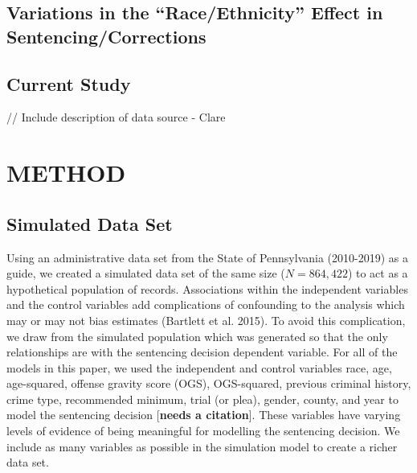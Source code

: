 \documentclass[
  letterpaper,
  DIV=11,
  numbers=noendperiod]{scrartcl}
\begin{document}
\hypertarget{sec-race-effect-sentencing}{%
\subsection{Variations in the ``Race/Ethnicity'' Effect in
Sentencing/Corrections}\label{sec-race-effect-sentencing}}

\hypertarget{sec-current-study}{%
\subsection{Current Study}\label{sec-current-study}}

// Include description of data source - Clare

\hypertarget{sec-method}{%
\section{METHOD}\label{sec-method}}

\hypertarget{sec-sim-data}{%
\subsection{Simulated Data Set}\label{sec-sim-data}}

Using an administrative data set from the State of Pennsylvania
(2010-2019) as a guide, we created a simulated data set of the same size
(\(N = 864,422\)) to act as a hypothetical population of records.
Associations within the independent variables and the control variables
add complications of confounding to the analysis which may or may not
bias estimates (Bartlett et al. 2015). To avoid this complication, we
draw from the simulated population which was generated so that the only
relationships are with the sentencing decision dependent variable. For
all of the models in this paper, we used the independent and control
variables race, age, age-squared, offense gravity score (OGS),
OGS-squared, previous criminal history, crime type, recommended minimum,
trial (or plea), gender, county, and year to model the sentencing
decision {[}\textbf{needs a citation}{]}. These variables have varying
levels of evidence of being meaningful for modelling the sentencing
decision. We include as many variables as possible in the simulation
model to create a richer data set.
\end{document}
